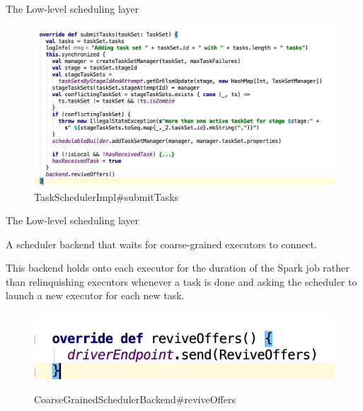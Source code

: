 \begin{frame}[plain,t]{The Low-level scheduling layer} %
	 \\  \vspace{2ex}
	\begin{figure}
		\centering
		\includegraphics[width=0.9\linewidth]{images/dag006}
		\caption{TaskSchedulerImpl\#submitTasks}
		\label{fig:dag006}
	\end{figure}
	
\end{frame}
\begin{frame}[plain,t]{The Low-level scheduling layer} %
	 \\  \vspace{2ex}
	
	A scheduler backend that waits for coarse-grained executors to connect.
	
	\vspace{2ex}
	
	 This backend holds onto each executor for the duration of the Spark job rather than relinquishing executors whenever a task is done and asking the scheduler to launch a new executor for  each new task.
	 
	 \begin{figure}
	 	\centering
	 	\includegraphics[width=0.9\linewidth]{images/backend001}
	 	\caption{CoarseGrainedSchedulerBackend\#reviveOffers}
	 	\label{fig:backend001}
	 \end{figure}
	 
	
\end{frame}
